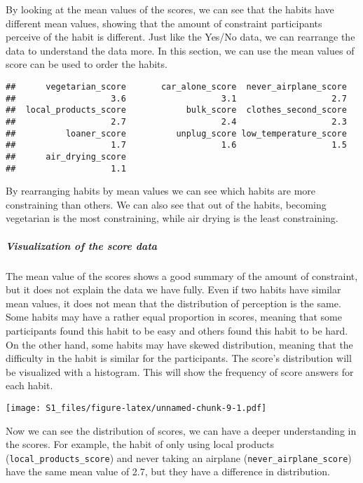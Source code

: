 \documentclass[
]{article}
\begin{document}
By looking at the mean values of the scores, we can see that the habits
have different mean values, showing that the amount of constraint
participants perceive of the habit is different. Just like the Yes/No
data, we can rearrange the data to understand the data more. In this
section, we can use the mean values of score can be used to order the
habits.

\begin{verbatim}
##      vegetarian_score       car_alone_score  never_airplane_score 
##                   3.6                   3.1                   2.7 
##  local_products_score            bulk_score  clothes_second_score 
##                   2.7                   2.4                   2.3 
##          loaner_score          unplug_score low_temperature_score 
##                   1.7                   1.6                   1.5 
##      air_drying_score 
##                   1.1
\end{verbatim}

By rearranging habits by mean values we can see which habits are more
constraining than others. We can also see that out of the habits,
becoming vegetarian is the most constraining, while air drying is the
least constraining.

\hypertarget{visualization-of-the-score-data}{%
\subparagraph{Visualization of the score
data}\label{visualization-of-the-score-data}}

The mean value of the scores shows a good summary of the amount of
constraint, but it does not explain the data we have fully. Even if two
habits have similar mean values, it does not mean that the distribution
of perception is the same. Some habits may have a rather equal
proportion in scores, meaning that some participants found this habit to
be easy and others found this habit to be hard. On the other hand, some
habits may have skewed distribution, meaning that the difficulty in the
habit is similar for the participants. The score's distribution will be
visualized with a histogram. This will show the frequency of score
answers for each habit.

\texttt{[image: S1\_files/figure-latex/unnamed-chunk-9-1.pdf]}

Now we can see the distribution of scores, we can have a deeper
understanding in the scores. For example, the habit of only using local
products (\texttt{local\_products\_score}) and never taking an airplane
(\texttt{never\_airplane\_score}) have the same mean value of 2.7, but
they have a difference in distribution.
\end{document}
